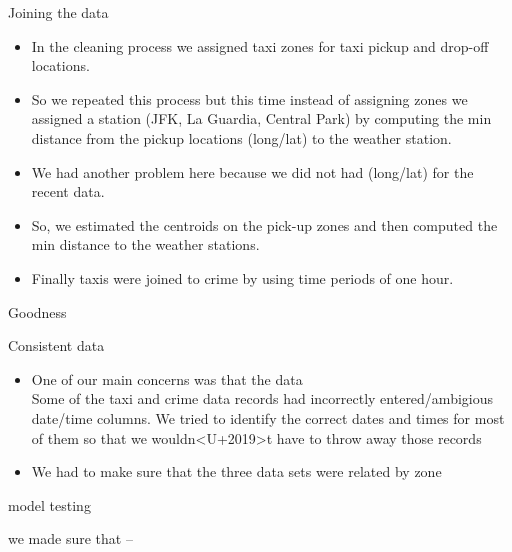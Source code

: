 \documentclass[10pt,ignorenonframetext,]{beamer}
\providecommand{\tightlist}{%
  \setlength{\itemsep}{0pt}\setlength{\parskip}{0pt}}
\begin{document}
\begin{frame}

\begin{block}{Joining the data}

\begin{itemize}[<+->]
\tightlist
\item
  In the cleaning process we assigned taxi zones for taxi pickup and
  drop-off locations.
\end{itemize}

\begin{itemize}[<+->]
\tightlist
\item
  So we repeated this process but this time instead of assigning zones
  we assigned a station (JFK, La Guardia, Central Park) by computing the
  min distance from the pickup locations (long/lat) to the weather
  station.
\item
  We had another problem here because we did not had (long/lat) for the
  recent data.
\item
  So, we estimated the centroids on the pick-up zones and then computed
  the min distance to the weather stations.
\end{itemize}

\begin{itemize}[<+->]
\tightlist
\item
  Finally taxis were joined to crime by using time periods of one hour.
\end{itemize}

\end{block}

\end{frame}

\begin{frame}{%
\protect\hypertarget{goodness}{%
Goodness}}

\begin{block}{Consistent data}

\begin{itemize}
\tightlist
\item
  One of our main concerns was that the data\\
  Some of the taxi and crime data records had incorrectly
  entered/ambigious date/time columns. We tried to identify the correct
  dates and times for most of them so that we
  wouldn\textless{}U+2019\textgreater{}t have to throw away those
  records
\item
  We had to make sure that the three data sets were related by zone
\end{itemize}

\end{block}

\begin{block}{model testing}

we made sure that –

\end{block}

\end{frame}
\end{document}
